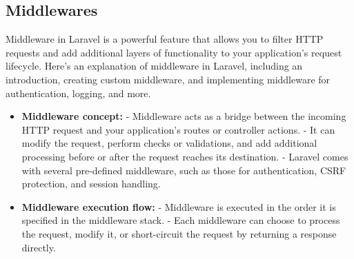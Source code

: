 \subsection{Middlewares}
Middleware in Laravel is a powerful feature that allows you to filter HTTP requests and add additional layers of functionality to your application's request lifecycle. Here's an explanation of middleware in Laravel, including an introduction, creating custom middleware, and implementing middleware for authentication, logging, and more.
\begin{itemize}
    \item \textbf{Middleware concept:}
   - Middleware acts as a bridge between the incoming HTTP request and your application's routes or controller actions.
   - It can modify the request, perform checks or validations, and add additional processing before or after the request reaches its destination.
   - Laravel comes with several pre-defined middleware, such as those for authentication, CSRF protection, and session handling.

   \item \textbf{Middleware execution flow:}
   - Middleware is executed in the order it is specified in the middleware stack.
   - Each middleware can choose to process the request, modify it, or short-circuit the request by returning a response directly.

\end{itemize}  

